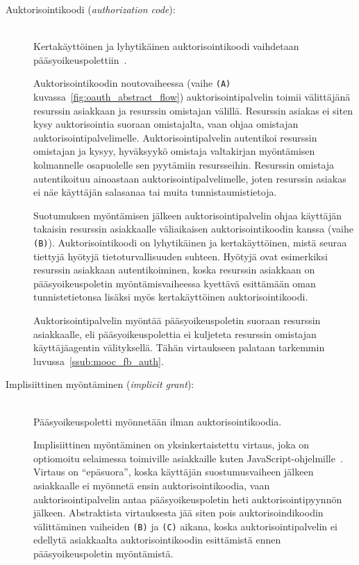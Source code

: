 \documentclass[finnish,gradu]{tktltiki}
\begin{document}
  \begin{description}
  \item[Auktorisointikoodi (\emph{authorization code}):] \hfill \\
  Kertakäyttöinen ja lyhytikäinen auktorisointikoodi vaihdetaan pääsyoikeuspolettiin~\cite{ietf_oauth2}.

  Auktorisointikoodin noutovaiheessa (vaihe \verb!(A)! kuvassa~\ref{fig:oauth_abstract_flow}) auktorisointipalvelin toimii välittäjänä resurssin asiakkaan ja resurssin omistajan välillä. Resurssin asiakas ei siten kysy auktorisointia suoraan omistajalta, vaan ohjaa omistajan auktorisointipalvelimelle. Auktorisointipalvelin autentikoi resurssin omistajan ja kysyy, hyväksyykö omistaja valtakirjan myöntämisen kolmannelle osapuolelle sen pyytämiin resursseihin. Resurssin omistaja autentikoituu ainoastaan auktorisointipalvelimelle, joten resurssin asiakas ei näe käyttäjän salasanaa tai muita tunnistaumistietoja.

  Suotumuksen myöntämisen jälkeen auktorisointipalvelin ohjaa käyttäjän takaisin resurssin asiakkaalle väliaikaisen auktorisointikoodin kanssa (vaihe \verb!(B)!). Auktorisointikoodi on lyhytikäinen ja kertakäyttöinen, mistä seuraa tiettyjä hyötyjä tietoturvallisuuden suhteen. Hyötyjä ovat esimerkiksi resurssin asiakkaan autentikoiminen, koska resurssin asiakkaan on pääsyoikeuspoletin myöntämisvaiheessa kyettävä esittämään oman tunnistetietonsa lisäksi myös kertakäyttöinen auktorisointikoodi.

  Auktorisointipalvelin myöntää pääsyoikeuspoletin suoraan resurssin asiakkaalle, eli pääsyoikeuspolettia ei kuljeteta resurssin omistajan käyttäjäagentin välityksellä. Tähän virtaukseen palataan tarkemmin luvussa~\ref{ssub:mooc_fb_auth}.

  \item[Implisiittinen myöntäminen (\emph{implicit grant}):] \hfill \\
  Pääsyoikeuspoletti myönnetään ilman auktorisointikoodia.

  Implisiittinen myöntäminen on yksinkertaistettu virtaus, joka on optiomoitu selaimessa toimiville asiakkaille kuten JavaScript-ohjelmille~\cite{ietf_oauth2}. Virtaus on ``epäsuora'', koska käyttäjän suostumusvaiheen jälkeen asiakkaalle ei myönnetä ensin auktorisointikoodia, vaan auktorisointipalvelin antaa pääsyoikeuspoletin heti auktorisointipyynnön jälkeen. Abstraktista virtauksesta jää siten pois auktorisoindikoodin välittäminen vaiheiden \verb!(B)! ja \verb!(C)! aikana, koska auktorisointipalvelin ei edellytä asiakkaalta auktorisointikoodin esittämistä ennen pääsyoikeuspoletin myöntämistä.


\end{description}
\end{document}
